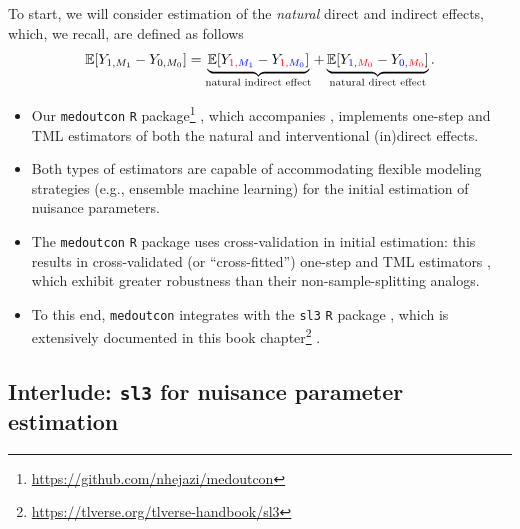 \documentclass[
  12pt,
]{book}
\newcommand{\passthrough}[1]{#1}
\providecommand{\tightlist}{%
  \setlength{\itemsep}{0pt}\setlength{\parskip}{0pt}}
\renewcommand{\href}[2]{#2\footnote{\url{#1}}}
\theoremstyle{definition}
\theoremstyle{definition}
\theoremstyle{definition}
\newcommand{\E}{\mathbb{E}}
\newcommand{\1}{\mathbbm{1}}
\begin{document}
To start, we will consider estimation of the \emph{natural} direct and indirect effects,
which, we recall, are defined as follows
\begin{equation*}
  \E[Y_{1,M_1} - Y_{0,M_0}] = \underbrace{\E[Y_{\color{red}{1},\color{blue}{M_1}} -
    Y_{\color{red}{1},\color{blue}{M_0}}]}_{\text{natural indirect effect}} +
    \underbrace{\E[Y_{\color{blue}{1},\color{red}{M_0}} -
    Y_{\color{blue}{0},\color{red}{M_0}}]}_{\text{natural direct effect}}.
\end{equation*}

\begin{itemize}
\tightlist
\item
  Our \href{https://github.com/nhejazi/medoutcon}{\passthrough{\lstinline!medoutcon!} \passthrough{\lstinline!R!} package}
  \citep{hejazi2022medoutcon-rpkg, hejazi2022medoutcon-joss}, which accompanies
  \citet{diaz2020nonparametric}, implements one-step and TML estimators of both the
  natural and interventional (in)direct effects.
\item
  Both types of estimators are capable of accommodating flexible modeling
  strategies (e.g., ensemble machine learning) for the initial estimation of
  nuisance parameters.
\item
  The \passthrough{\lstinline!medoutcon!} \passthrough{\lstinline!R!} package uses cross-validation in initial estimation: this
  results in cross-validated (or ``cross-fitted'') one-step and TML estimators
  \citep{klaassen1987consistent, zheng2011cross, chernozhukov2018double}, which
  exhibit greater robustness than their non-sample-splitting analogs.
\item
  To this end, \passthrough{\lstinline!medoutcon!} integrates with the \passthrough{\lstinline!sl3!} \passthrough{\lstinline!R!} package \citep{coyle2022sl3},
  which is extensively documented in this \href{https://tlverse.org/tlverse-handbook/sl3}{book
  chapter} \citep{phillips2022super, vdl2022targeted}.
\end{itemize}

\hypertarget{interlude-sl3-for-nuisance-parameter-estimation}{%
\subsection{\texorpdfstring{Interlude: \texttt{sl3} for nuisance parameter estimation}{Interlude: sl3 for nuisance parameter estimation}}\label{interlude-sl3-for-nuisance-parameter-estimation}}
\end{document}
